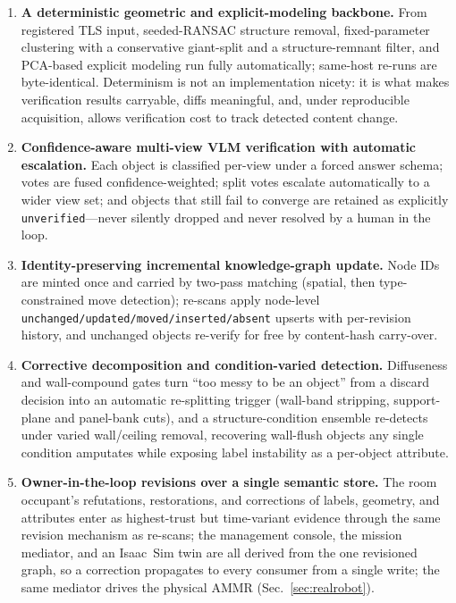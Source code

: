 \begin{enumerate}
\item \textbf{A deterministic geometric and explicit-modeling backbone.}
From registered TLS input, seeded-RANSAC structure removal, fixed-parameter
clustering with a conservative giant-split and a structure-remnant filter,
and PCA-based explicit modeling run fully automatically; same-host re-runs
are byte-identical. Determinism is not an implementation nicety: it is what
makes verification results carryable, diffs meaningful, and, under
reproducible acquisition, allows verification cost to track detected
content change.
\item \textbf{Confidence-aware multi-view VLM verification with automatic
escalation.} Each object is classified per-view under a forced answer
schema; votes are fused confidence-weighted; split votes escalate
automatically to a wider view set; and objects that still fail to converge
are retained as explicitly \texttt{unverified}---never silently dropped and
never resolved by a human in the loop.
\item \textbf{Identity-preserving incremental knowledge-graph update.}
Node IDs are minted once and carried by two-pass matching (spatial, then
type-constrained move detection); re-scans apply node-level
\texttt{unchanged/updated/moved/inserted/absent} upserts with per-revision
history, and unchanged objects re-verify for free by content-hash carry-over.
\item \textbf{Corrective decomposition and condition-varied detection.}
Diffuseness and wall-compound gates turn ``too messy to be an object''
from a discard decision into an automatic re-splitting trigger (wall-band
stripping, support-plane and panel-bank cuts), and a structure-condition
ensemble re-detects under varied wall/ceiling removal, recovering
wall-flush objects any single condition amputates while exposing label
instability as a per-object attribute.
\item \textbf{Owner-in-the-loop revisions over a single semantic store.}
The room occupant's refutations, restorations, and corrections of labels,
geometry, and attributes enter as highest-trust but time-variant evidence
through the same revision mechanism as re-scans; the management console,
the mission mediator, and an Isaac~Sim twin are all derived from the one
revisioned graph, so a correction propagates to every consumer from a
single write; the same mediator drives the physical AMMR
(Sec.~\ref{sec:realrobot}).
\end{enumerate}

